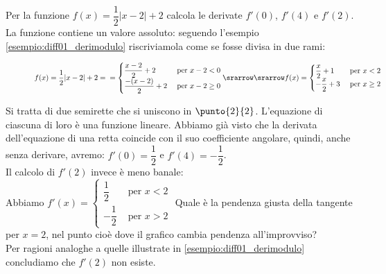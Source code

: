 \begin{esempio}
 Per la funzione $f(x)=\dfrac{1}{2}|x-2|+2$ calcola le derivate $f'(0)$, 
$f'(4)$ e $f'(2)$.\\
 La funzione contiene un valore assoluto: seguendo l’esempio 
\ref{esempio:diff01_derimodulo} riscriviamola come se fosse 
 divisa in due rami:

\begin{figure}[h!]
\begin{inaccessibleblock}
 \begin{center}
 \begin{minipage}[]{.40 \textwidth}
  \derivamodulodue
  \caption{}
 \end{minipage} 
 \hfill
 \begin{minipage}[]{.58 \textwidth}
$f(x)= \dfrac{1}{2}|x-2|+2=\\
=\begin{cases}
  \dfrac{x-2}{2}+2 &\text{ per } x-2< 0  \\
 \dfrac{-(x-2)}{2}+2 &\text{ per } x-2 \ge 0
\end{cases} 
\srarrow\\
\srarrow f(x)= \begin{cases}
 \dfrac{x}{2}+1 &\text{ per } x<2 \\
 -\dfrac{x}{2}+3 &\text{ per } x\ge 2
\end{cases}$
\end{minipage}
\end{center}
\end{inaccessibleblock}
\label{}
\end{figure} 

Si tratta di due semirette che si uniscono in $\punto{2}{2}$. L'equazione
di ciascuna di loro è una funzione lineare. Abbiamo già visto che la derivata 
dell'equazione di una retta coincide con il suo coefficiente angolare, 
quindi, anche senza derivare, avremo:
$f'(0)=\dfrac{1}{2}$ e $f'(4)=-\dfrac{1}{2}$.\\
Il calcolo di $f'(2)$ invece è meno banale:\\
Abbiamo
$f'(x)= \begin{cases}
 \dfrac{1}{2} &\text{ per } x<2 \\
 -\dfrac{1}{2} &\text{ per } x > 2
\end{cases}$
Quale è la pendenza giusta della tangente per
$x=2$, nel punto cioè dove il grafico cambia pendenza all'improvviso?\\
Per ragioni analoghe a quelle illustrate in \ref{esempio:diff01_derimodulo}
concludiamo che $f'(2)$  non esiste.
\end{esempio}

